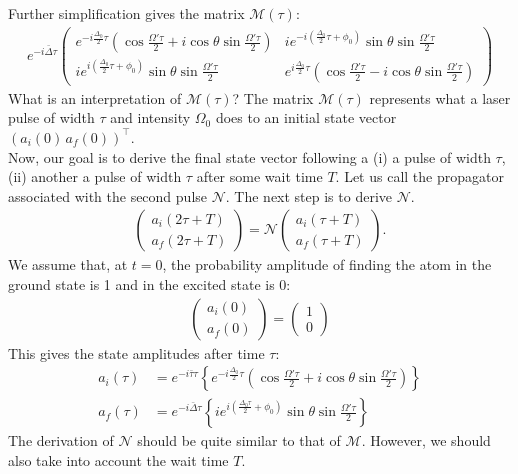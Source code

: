 \documentclass{article}
\begin{document}
Further simplification gives the matrix $\mathcal{M}(\tau)$:
\begin{align}
\boxed{e^{-i\bar{\Delta}\tau}\begin{pmatrix}
e^{-i\frac{\Delta_0}{2}\tau}\left(\cos\frac{\Omega'\tau}{2} + i\cos\theta\sin\frac{\Omega'\tau}{2} \right) & ie^{-i\left( \frac{\Delta_0}{2}\tau + \phi_0\right) }\sin\theta\sin\frac{\Omega'\tau}{2}\\
ie^{i\left( \frac{\Delta_0}{2}\tau + \phi_0\right) }\sin\theta\sin\frac{\Omega'\tau}{2} & e^{i\frac{\Delta_0}{2}\tau}\left(\cos\frac{\Omega'\tau}{2}-i\cos\theta\sin\frac{\Omega'\tau}{2} \right)
\end{pmatrix}}
\end{align}
What is an interpretation of $\mathcal{M}(\tau)$? The matrix $\mathcal{M}(\tau)$ represents what a laser pulse of width $\tau$ and intensity $\Omega_0$ does to an initial state vector $(a_i(0){\,} a_f(0))^\top$.\\

Now, our goal is to derive the final state vector following a (i) a pulse of width $\tau$, (ii) another a pulse of width $\tau$ after some wait time $T$. Let us call the propagator associated with the second pulse $\mathcal{N}$. The next step is to derive $\mathcal{N}$.
\begin{align}
\begin{pmatrix}
a_i(2\tau + T)\\a_f(2\tau + T)
\end{pmatrix}=
\mathcal{N}\begin{pmatrix}
a_i(\tau + T)\\a_f(\tau + T)
\end{pmatrix}.
\end{align}
We assume that, at $t = 0$, the probability amplitude of finding the atom in the ground state is 1 and in the excited state is 0:
\begin{align}
\boxed{\begin{pmatrix}
a_i(0) \\ a_f(0)
\end{pmatrix}
= \begin{pmatrix}
1 \\ 0
\end{pmatrix}}
\end{align}
This gives the state amplitudes after time $\tau$:
\begin{align}
a_i(\tau) &= e^{-i\bar{\tau}\tau}\left\{ e^{-i\frac{\Delta_0}{2}\tau}\left(\cos\frac{\Omega'\tau}{2} + i\cos\theta\sin\frac{\Omega'\tau}{2} \right) \right\}\nonumber\\
a_f(\tau) &= e^{-i\bar{\Delta}\tau}\left\{ie^{i\left(\frac{\Delta_0\tau}{2} + \phi_0 \right) }\sin\theta\sin\frac{\Omega'\tau}{2} \right\} 
\end{align}
The derivation of $\mathcal{N}$ should be quite similar to that of $\mathcal{M}$. However, we should also take into account the wait time $T$.
\end{document}
